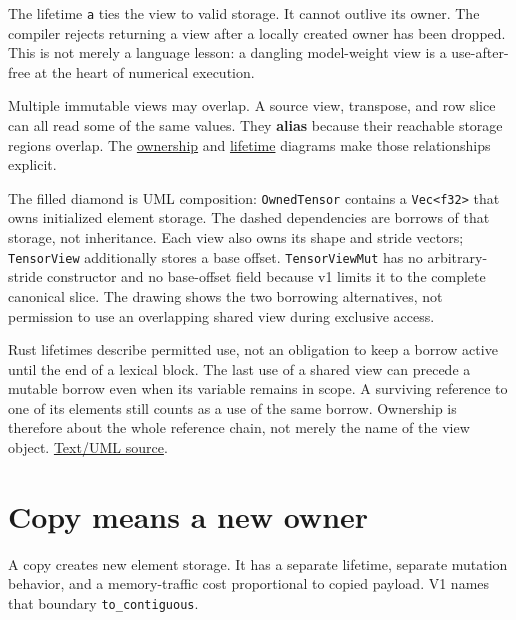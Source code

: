 The lifetime \texttt{\textquotesingle{}a} ties the view to valid
storage. It cannot outlive its owner. The compiler rejects returning a
view after a locally created owner has been dropped. This is not merely
a language lesson: a dangling model-weight view is a use-after-free at
the heart of numerical execution.

Multiple immutable views may overlap. A source view, transpose, and row
slice can all read some of the same values. They \textbf{alias} because
their reachable storage regions overlap. The
\href{https://github.com/hermonai/inside-the-llm-engine/blob/astra-visual-rewrite/diagrams/tensor/tensor-ownership.txt}{ownership}
and
\href{https://github.com/hermonai/inside-the-llm-engine/blob/astra-visual-rewrite/diagrams/tensor/tensor-memory-lifetime.txt}{lifetime}
diagrams make those relationships explicit.


The filled diamond is UML composition: \texttt{OwnedTensor} contains a
\texttt{Vec\textless{}f32\textgreater{}} that owns initialized element
storage. The dashed dependencies are borrows of that storage, not
inheritance. Each view also owns its shape and stride vectors;
\texttt{TensorView} additionally stores a base offset.
\texttt{TensorViewMut} has no arbitrary-stride constructor and no
base-offset field because v1 limits it to the complete canonical slice.
The drawing shows the two borrowing alternatives, not permission to use
an overlapping shared view during exclusive access.

Rust lifetimes describe permitted use, not an obligation to keep a
borrow active until the end of a lexical block. The last use of a shared
view can precede a mutable borrow even when its variable remains in
scope. A surviving reference to one of its elements still counts as a
use of the same borrow. Ownership is therefore about the whole reference
chain, not merely the name of the view object.
\href{https://github.com/hermonai/inside-the-llm-engine/blob/astra-visual-rewrite/figures/generated/tensor-ownership.txt}{Text/UML
source}.

\section{Copy means a new owner}\label{copy-means-a-new-owner}

A copy creates new element storage. It has a separate lifetime, separate
mutation behavior, and a memory-traffic cost proportional to copied
payload. V1 names that boundary \texttt{to\_contiguous}.

